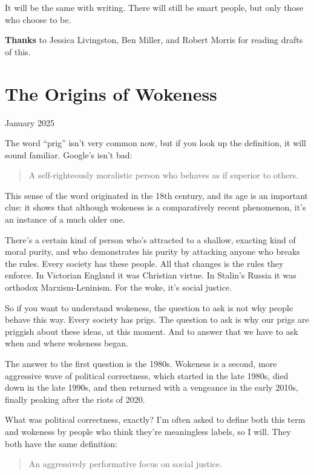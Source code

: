 \documentclass[12pt]{book}
\begin{document}
It will be the same with writing. There will still be smart people, but
only those who choose to be.

\textbf{Thanks} to Jessica Livingston, Ben Miller, and Robert Morris for
reading drafts of this.
\chapter{The Origins of Wokeness}

January 2025

The word ``prig'' isn't very common now, but if you look up the
definition, it will sound familiar. Google's isn't bad:

\begin{quote}
A self-righteously moralistic person who behaves as if superior to
others.
\end{quote}

This sense of the word originated in the 18th century, and its age is an
important clue: it shows that although wokeness is a comparatively
recent phenomenon, it's an instance of a much older one.

There's a certain kind of person who's attracted to a shallow, exacting
kind of moral purity, and who demonstrates his purity by attacking
anyone who breaks the rules. Every society has these people. All that
changes is the rules they enforce. In Victorian England it was Christian
virtue. In Stalin's Russia it was orthodox Marxism-Leninism. For the
woke, it's social justice.

So if you want to understand wokeness, the question to ask is not why
people behave this way. Every society has prigs. The question to ask is
why our prigs are priggish about these ideas, at this moment. And to
answer that we have to ask when and where wokeness began.

The answer to the first question is the 1980s. Wokeness is a second,
more aggressive wave of political correctness, which started in the late
1980s, died down in the late 1990s, and then returned with a vengeance
in the early 2010s, finally peaking after the riots of 2020.

What was political correctness, exactly? I'm often asked to define both
this term and wokeness by people who think they're meaningless labels,
so I will. They both have the same definition:

\begin{quote}
An aggressively performative focus on social justice.
\end{quote}
\end{document}
